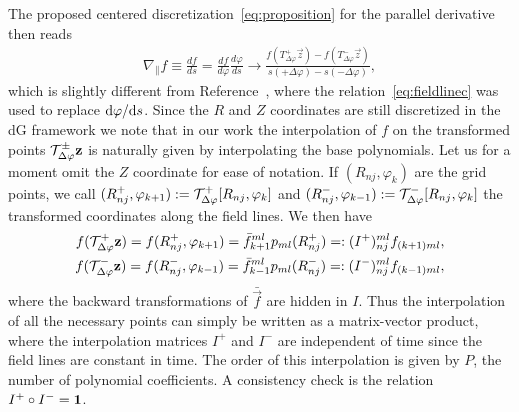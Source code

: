 The proposed centered discretization~\eqref{eq:proposition} for the parallel derivative then reads
\begin{align}
    \nabla_\parallel f \equiv \frac{df}{ds} = \frac{df}{d\varphi}\frac{d\varphi}{ds} 
    \rightarrow \frac{f\left(T_{\Delta\varphi}^+\vec z\right)-f\left(T_{\Delta\varphi}^-\vec z\right)}{s(+\Delta\varphi) - s(-\Delta\varphi)},
    \label{eq:paralleldis}
\end{align}
which is slightly different from Reference~\cite{Hariri2014}, where
the relation~\eqref{eq:fieldlinec} was used to replace $\mathrm{d} \varphi/\mathrm{d} s$. 
Since the $R$ and $Z$ coordinates are still discretized in the dG framework we note that in our work
the interpolation of $f$ on the transformed points $\mathcal T^\pm_{\Delta\varphi}{\mathbf{z}}$
is naturally given by interpolating the base polynomials. 
Let us for a moment omit the $Z$ coordinate for ease of notation. 
If $(R_{nj}, \varphi_k)$ are the grid points, 
we call $(R^+_{nj}, \varphi_{k+1}) := \mathcal T^+_{\Delta\varphi}[R_{nj}, \varphi_k]$ and 
$(R_{nj}^-, \varphi_{k-1}) := \mathcal T^-_{\Delta\varphi}[R_{nj}, \varphi_k]$ the transformed coordinates along
the field lines. We then have
\begin{subequations}
\begin{align}
    f(\mathcal T^+_{\Delta\varphi}{\mathbf{z}}) = f( R^+_{nj}, \varphi_{k+1}) = \bar f_{k+1}^{ml}p_{ml}(R^+_{nj}) =: (I^+)_{nj}^{ml}f_{(k+1)ml} , \\
    f(\mathcal T^-_{\Delta\varphi}{\mathbf{z}}) = f( R^-_{nj}, \varphi_{k-1}) = \bar f_{k-1}^{ml}p_{ml}(R^-_{nj}) =: (I^-)_{nj}^{ml}f_{(k-1)ml} , 
\end{align}
\label{eq:interpolation}
\end{subequations}
where the backward transformations of $\bar{ \vec f}$ are hidden in $I$.
Thus the interpolation of all the necessary points can simply be written as a matrix-vector product, where the interpolation matrices $I^+$  and $I^-$ are independent of time since
the field lines are constant in time. The order of this interpolation is given by $P$, the number of polynomial coefficients.
A consistency check is the relation $I^+\circ I^- = \mathbf{1}$. 

